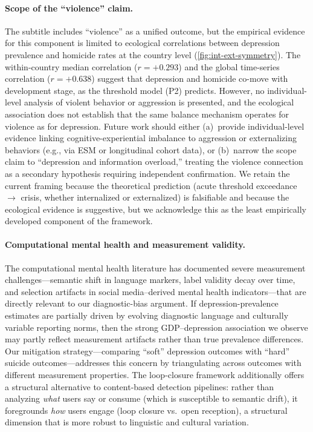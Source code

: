 \documentclass[a4paper,11pt,titlepage]{article}
\begin{document}
\paragraph{Scope of the ``violence'' claim.}
The subtitle includes ``violence'' as a unified outcome, but the empirical evidence for this component is limited to ecological correlations between depression prevalence and homicide rates at the country level (\cref{fig:int-ext-symmetry}). The within-country median correlation ($r = +0.293$) and the global time-series correlation ($r = +0.638$) suggest that depression and homicide co-move with development stage, as the threshold model (P2) predicts. However, no individual-level analysis of violent behavior or aggression is presented, and the ecological association does not establish that the same balance mechanism operates for violence as for depression. Future work should either (a)~provide individual-level evidence linking cognitive-experiential imbalance to aggression or externalizing behaviors (e.g., via ESM or longitudinal cohort data), or (b)~narrow the scope claim to ``depression and information overload,'' treating the violence connection as a secondary hypothesis requiring independent confirmation. We retain the current framing because the theoretical prediction (acute threshold exceedance $\to$ crisis, whether internalized or externalized) is falsifiable and because the ecological evidence is suggestive, but we acknowledge this as the least empirically developed component of the framework.

\paragraph{Computational mental health and measurement validity.}
The computational mental health literature has documented severe measurement challenges---semantic shift in language markers, label validity decay over time, and selection artifacts in social media--derived mental health indicators---that are directly relevant to our diagnostic-bias argument. If depression-prevalence estimates are partially driven by evolving diagnostic language and culturally variable reporting norms, then the strong GDP--depression association we observe may partly reflect measurement artifacts rather than true prevalence differences. Our mitigation strategy---comparing ``soft'' depression outcomes with ``hard'' suicide outcomes---addresses this concern by triangulating across outcomes with different measurement properties. The loop-closure framework additionally offers a structural alternative to content-based detection pipelines: rather than analyzing \textit{what} users say or consume (which is susceptible to semantic drift), it foregrounds \textit{how} users engage (loop closure vs.\ open reception), a structural dimension that is more robust to linguistic and cultural variation.
\end{document}
